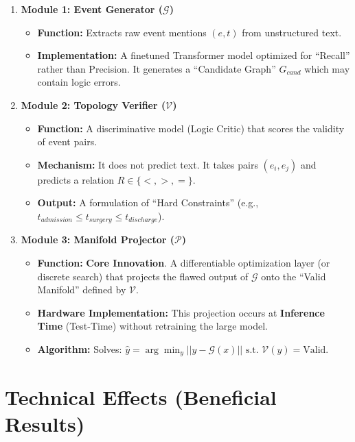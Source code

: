 \documentclass[12pt,a4paper]{article}
\begin{document}
\begin{enumerate}
    \item \textbf{Module 1: Event Generator ($\mathcal{G}$)}
    \begin{itemize}
        \item \textbf{Function:} Extracts raw event mentions $(e, t)$ from unstructured text.
        \item \textbf{Implementation:} A finetuned Transformer model optimized for ``Recall'' rather than Precision. It generates a ``Candidate Graph'' $G_{cand}$ which may contain logic errors.
    \end{itemize}
    
    \item \textbf{Module 2: Topology Verifier ($\mathcal{V}$)}
    \begin{itemize}
        \item \textbf{Function:} A discriminative model (Logic Critic) that scores the validity of event pairs.
        \item \textbf{Mechanism:} It does not predict text. It takes pairs $(e_i, e_j)$ and predicts a relation $R \in \{<, >, =\}$.
        \item \textbf{Output:} A formulation of ``Hard Constraints'' (e.g., $t_{admission} \le t_{surgery} \le t_{discharge}$).
    \end{itemize}
    
    \item \textbf{Module 3: Manifold Projector ($\mathcal{P}$)}
    \begin{itemize}
        \item \textbf{Function:} \textbf{Core Innovation}. A differentiable optimization layer (or discrete search) that projects the flawed output of $\mathcal{G}$ onto the ``Valid Manifold'' defined by $\mathcal{V}$.
        \item \textbf{Hardware Implementation:} This projection occurs at \textbf{Inference Time} (Test-Time) without retraining the large model.
        \item \textbf{Algorithm:} Solves: $\hat{y} = \arg\min_{y} ||y - \mathcal{G}(x)|| \text{ s.t. } \mathcal{V}(y) = \text{Valid}$.
    \end{itemize}
\end{enumerate}

\section{Technical Effects (Beneficial Results)}
\end{document}
